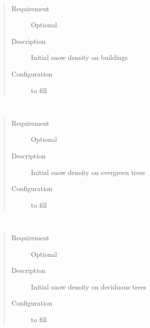 \documentclass[letterpaper,10pt,english]{sphinxmanual}
\begin{document}
\begin{fulllineitems}
\label{\detokenize{input_files/Initial_Conditions/Snow_related_parameters:cmdoption-arg-snowdensbldgs}}~\begin{quote}\begin{description}
\item[{Requirement}] \leavevmode
Optional

\item[{Description}] \leavevmode
Initial snow density on buildings

\item[{Configuration}] \leavevmode
to fill

\end{description}\end{quote}

\end{fulllineitems}


\begin{fulllineitems}
\label{\detokenize{input_files/Initial_Conditions/Snow_related_parameters:cmdoption-arg-snowdensevetr}}~\begin{quote}\begin{description}
\item[{Requirement}] \leavevmode
Optional

\item[{Description}] \leavevmode
Initial snow density on evergreen trees

\item[{Configuration}] \leavevmode
to fill

\end{description}\end{quote}

\end{fulllineitems}


\begin{fulllineitems}
\label{\detokenize{input_files/Initial_Conditions/Snow_related_parameters:cmdoption-arg-snowdensdectr}}~\begin{quote}\begin{description}
\item[{Requirement}] \leavevmode
Optional

\item[{Description}] \leavevmode
Initial snow density on deciduous trees

\item[{Configuration}] \leavevmode
to fill

\end{description}\end{quote}

\end{fulllineitems}
\end{document}
